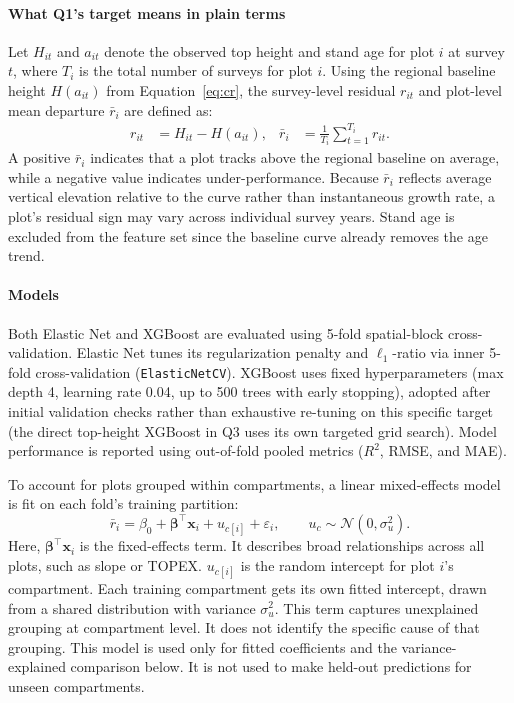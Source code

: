 \documentclass[logo,msc,ai]{infthesis}           %
\begin{document}
\paragraph*{What Q1's target means in plain terms}
Let $H_{it}$ and $a_{it}$ denote the observed top height and stand age for plot $i$ at survey $t$, where $T_i$ is the total number of surveys for plot $i$. Using the regional baseline height $H(a_{it})$ from Equation~\eqref{eq:cr}, the survey-level residual $r_{it}$ and plot-level mean departure $\bar{r}_i$ are defined as:
\begin{align}
r_{it} &= H_{it} - H(a_{it}), \label{eq:cr-gap} &
\bar{r}_i &= \frac{1}{T_i} \sum_{t=1}^{T_i} r_{it}. \label{eq:mean-cr-residual}
\end{align}
A positive $\bar{r}_i$ indicates that a plot tracks above the regional baseline on average, while a negative value indicates under-performance. Because $\bar{r}_i$ reflects average vertical elevation relative to the curve rather than instantaneous growth rate, a plot's residual sign may vary across individual survey years. Stand age is excluded from the feature set since the baseline curve already removes the age trend.

\paragraph*{Models}
Both Elastic Net and XGBoost are evaluated using 5-fold spatial-block cross-validation. Elastic Net tunes its regularization penalty and $\ell_1$-ratio via inner 5-fold cross-validation (\texttt{ElasticNetCV}). XGBoost uses fixed hyperparameters (max depth 4, learning rate 0.04, up to 500 trees with early stopping), adopted after initial validation checks rather than exhaustive re-tuning on this specific target (the direct top-height XGBoost in Q3 uses its own targeted grid search). Model performance is reported using out-of-fold pooled metrics ($R^2$, RMSE, and MAE). 

To account for plots grouped within compartments, a linear mixed-effects model is fit on each fold's training partition:
\begin{equation}
\bar{r}_i = \beta_0 + \boldsymbol{\beta}^{\top}\mathbf{x}_i + u_{c[i]} + \varepsilon_i, \qquad u_c \sim \mathcal{N}(0, \sigma_u^2).
\label{eq:mixed-effects}
\end{equation}
Here, $\boldsymbol{\beta}^{\top}\mathbf{x}_i$ is the fixed-effects term. It describes broad relationships across all plots, such as slope or TOPEX. $u_{c[i]}$ is the random intercept for plot $i$'s compartment. Each training compartment gets its own fitted intercept, drawn from a shared distribution with variance $\sigma_u^2$. This term captures unexplained grouping at compartment level. It does not identify the specific cause of that grouping. This model is used only for fitted coefficients and the variance-explained comparison below. It is not used to make held-out predictions for unseen compartments.
\end{document}
